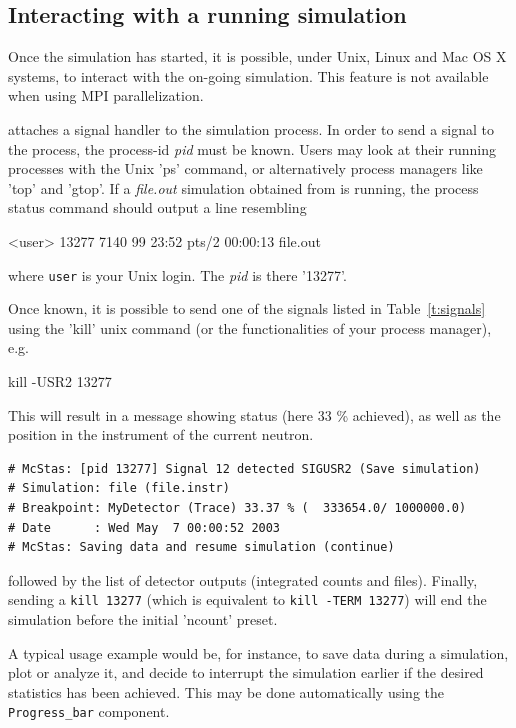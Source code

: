 \subsection{Interacting with a running simulation}

Once the simulation has started, it is possible, under Unix, Linux and Mac OS X systems, to interact with the on-going simulation. This feature is not available when using MPI parallelization.

\MCS attaches a signal handler to the simulation process. In order to send a signal to the process, the process-id \textit{pid} must be known. Users may look at their running processes with the Unix 'ps' command, or alternatively process managers like 'top' and 'gtop'.
If a \textit{file.out} simulation obtained from \MCS is running, the process status command should output a line resembling

\begin{bash}
<user> 13277 7140 99 23:52 pts/2   00:00:13   file.out
\end{bash}

where \verb+user+ is your Unix login. The \textit{pid} is there '13277'.

Once known, it is possible to send one of the signals listed in Table~\ref{t:signals} using the 'kill' unix command (or the functionalities of your process manager), e.g.
\begin{bash}
    kill -USR2 13277
\end{bash}

This will result in a message showing status (here 33 \% achieved), as well as the position in the instrument of the current neutron.
\begin{lstlisting}
# McStas: [pid 13277] Signal 12 detected SIGUSR2 (Save simulation)
# Simulation: file (file.instr)
# Breakpoint: MyDetector (Trace) 33.37 % (  333654.0/ 1000000.0)
# Date      : Wed May  7 00:00:52 2003
# McStas: Saving data and resume simulation (continue)
\end{lstlisting}
followed by the list of detector outputs (integrated counts and files). Finally, sending a \verb+kill 13277+ (which is equivalent to \verb+kill -TERM 13277+) will end the simulation before the initial 'ncount' preset.

A typical usage example would be, for instance, to save data during a
simulation, plot or analyze it, and decide to interrupt the simulation earlier
if the desired statistics has been achieved. This may be done automatically
using the \verb+Progress_bar+ component.

